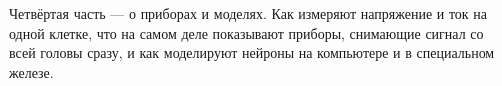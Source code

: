 \noindent Четвёртая часть --- о приборах и моделях. Как измеряют напряжение и ток на одной клетке, что на самом деле показывают приборы, снимающие сигнал со всей головы сразу, и как моделируют нейроны на компьютере и в специальном железе.
